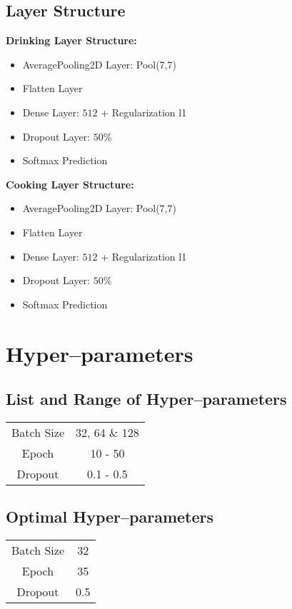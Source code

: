 \documentclass{article}
\begin{document}
\subsection{Layer Structure}

\textbf{Drinking Layer Structure:}
\begin{itemize}
    \item AveragePooling2D Layer: Pool(7,7)
    \item Flatten Layer
    \item Dense Layer: $512$ + Regularization l1
    \item Dropout Layer: $50\%$
    \item Softmax Prediction
\end{itemize}
\textbf{Cooking Layer Structure:}
\begin{itemize}
    \item AveragePooling2D Layer: Pool(7,7)
    \item Flatten Layer
    \item Dense Layer: $512$ + Regularization l1
    \item Dropout Layer: $50\%$
    \item Softmax Prediction
\end{itemize}

\section{Hyper--parameters}
\subsection{List and Range of Hyper--parameters}
\begin{center}
\begin{tabular}{|c|c|}
\hline
  Batch Size   &  32, 64 \& 128\\
  Epoch        &  10 - 50\\
  Dropout      &  0.1 - 0.5\\
\hline
\end{tabular}
\end{center}

\subsection{Optimal Hyper--parameters}
\begin{center}
\begin{tabular}{|c|c|}
\hline
  Batch Size   &  32\\
  Epoch        &  35\\
  Dropout      &  0.5\\
\hline
\end{tabular}
\end{center}
\end{document}
